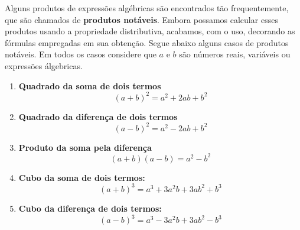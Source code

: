 Alguns produtos de expressões algébricas são encontrados tão frequentemente, que são chamados de \textbf{produtos notáveis}. Embora possamos calcular esses produtos usando a propriedade distributiva, acabamos, com o uso, decorando as fórmulas empregadas em sua obtenção. Segue abaixo alguns casos de produtos notáveis. Em todos os casos considere que $a$ e $b$ são números reais, variáveis ou expressões álgebricas. \\
\begin{enumerate}
\item \textbf{ Quadrado da soma de dois termos}
$$(a+b)^2= a^2+2ab+b^2$$
 \item \textbf{ Quadrado da diferença de dois termos}
$$(a-b)^2= a^2-2ab+b^2$$
 \item \textbf{ Produto da soma pela diferença}
$$(a+b)(a-b)=a^2-b^2$$
\item \textbf{ Cubo da soma de dois termos:}
$$(a+b)^3=a^3+3a^2b+3ab^2+b^3$$
\item \textbf{  Cubo da diferença de dois termos:}
$$(a-b)^3=a^3-3a^2b+3ab^2-b^3$$
\end{enumerate}
